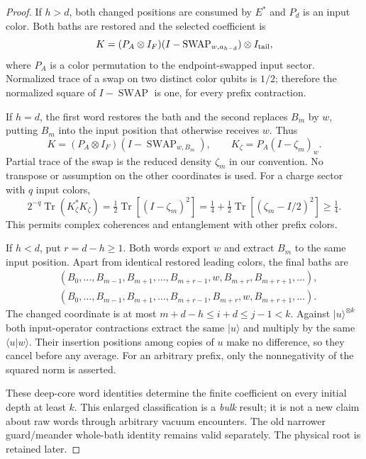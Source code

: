 \documentclass[11pt]{article}
\newcommand{\Tr}{\operatorname{Tr}}
\newcommand{\ket}[1]{\lvert #1\rangle}
\newcommand{\bra}[1]{\langle #1\rvert}
\newcommand{\SWAP}{\operatorname{SWAP}}
\begin{document}
\begin{proof}
If $h>d$, both changed positions are consumed by $E^*$ and $P_d$ is
an input color. Both baths are restored and the selected coefficient is
\[
 K=(P_A\otimes I_F)(I-\SWAP_{w,a_{h-d}})\otimes I_{\rm tail},
\]
where $P_A$ is a color permutation to the endpoint-swapped input sector.
Normalized trace of a swap on two distinct color qubits is $1/2$;
therefore the normalized square of $I-\SWAP$ is one, for every prefix
contraction.

If $h=d$, the first word restores the bath and the second replaces
$B_m$ by $w$, putting $B_m$ into the input position that otherwise
receives $w$. Thus
\[
 K=(P_A\otimes I_F)(I-\SWAP_{w,B_m}),\qquad
 K_\zeta=P_A(I-\zeta_m)_w.
\]
Partial trace of the swap is the reduced density $\zeta_m$ in our
convention. No transpose or assumption on the other coordinates is used.
For a charge sector with $q$ input colors,
\begin{equation}\label{eq:criticalsquare}
 2^{-q}\Tr(K_\zeta^*K_\zeta)
  =\tfrac12\Tr[(I-\zeta_m)^2]
  =\tfrac14+\tfrac12\Tr[(\zeta_m-I/2)^2]\ge\tfrac14.
\end{equation}
This permits complex coherences and entanglement with other prefix colors.

If $h<d$, put $r=d-h\ge1$. Both words export $w$ and extract $B_m$
to the same input position. Apart from identical restored leading colors,
the final baths are
\begin{align*}
 &(B_0,\ldots,B_{m-1},B_{m+1},\ldots,B_{m+r-1},
                         w,B_{m+r},B_{m+r+1},\ldots),\\
 &(B_0,\ldots,B_{m-1},B_{m+1},\ldots,B_{m+r-1},
                         B_{m+r},w,B_{m+r+1},\ldots).
\end{align*}
The changed coordinate is at most $m+d-h\le i+d\le j-1<k$.
Against $\ket u^{\otimes k}$ both input-operator contractions extract
the same $\ket u$ and multiply by the same $\bra u w\rangle$.
Their insertion positions among copies of $u$ make no difference, so
they cancel before any average. For an arbitrary prefix, only the
nonnegativity of the squared norm is asserted.

These deep-core word identities determine the finite coefficient on
every initial depth at least $k$. This enlarged classification is a
\emph{bulk} result; it is not a new claim about raw words through arbitrary
vacuum encounters. The old narrower guard/meander whole-bath identity
remains valid separately. The physical root is retained later.
\end{proof}
\end{document}
